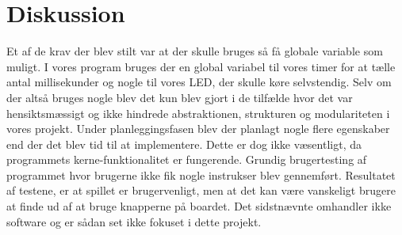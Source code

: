 \section{Diskussion}
Et af de krav der blev stilt var at der skulle bruges så få globale variable som muligt. I vores program bruges der en global variabel til vores timer for at tælle antal millisekunder og nogle til vores LED, der skulle køre selvstendig. Selv om der altså bruges nogle blev det kun blev gjort i de tilfælde hvor det var hensiktsmæssigt og ikke hindrede abstraktionen, strukturen og modulariteten i vores projekt.
Under planleggingsfasen blev der planlagt nogle flere egenskaber end der det blev tid til at implementere. Dette er dog ikke væsentligt, da programmets kerne-funktionalitet er fungerende.
Grundig brugertesting af programmet hvor brugerne ikke fik nogle instrukser blev gennemført. Resultatet af testene, er at spillet er brugervenligt, men at det kan være vanskeligt brugere at finde ud af at bruge knapperne på boardet. Det sidstnævnte omhandler ikke software og er sådan set ikke fokuset i dette projekt.